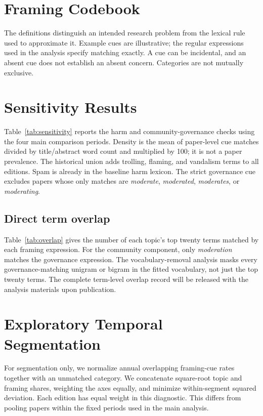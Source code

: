 \section{Framing Codebook}
\label{app:codebook}
The definitions distinguish an intended research problem from the lexical rule used to approximate it. Example cues are illustrative; the regular expressions used in the analysis specify matching exactly. A cue can be incidental, and an absent cue does not establish an absent concern. Categories are not mutually exclusive.

\section{Sensitivity Results}
\label{app:sensitivity}
Table~\ref{tab:sensitivity} reports the harm and community-governance checks using the four main comparison periods. Density is the mean of paper-level cue matches divided by title/abstract word count and multiplied by 100; it is not a paper prevalence. The historical union adds trolling, flaming, and vandalism terms to all editions. Spam is already in the baseline harm lexicon. The strict governance cue excludes papers whose only matches are \emph{moderate}, \emph{moderated}, \emph{moderates}, or \emph{moderating}.

\subsection{Direct term overlap}
Table~\ref{tab:overlap} gives the number of each topic's top twenty terms matched by each framing expression. For the community component, only \emph{moderation} matches the governance expression. The vocabulary-removal analysis masks every governance-matching unigram or bigram in the fitted vocabulary, not just the top twenty terms. The complete term-level overlap record will be released with the analysis materials upon publication.

\section{Exploratory Temporal Segmentation}
\label{app:boundaries}
For segmentation only, we normalize annual overlapping framing-cue rates together with an unmatched category. We concatenate square-root topic and framing shares, weighting the axes equally, and minimize within-segment squared deviation. Each edition has equal weight in this diagnostic. This differs from pooling papers within the fixed periods used in the main analysis.

